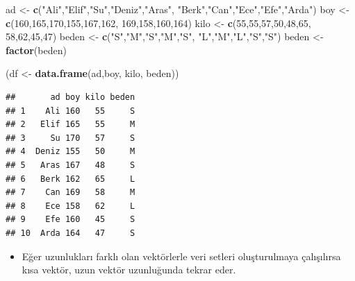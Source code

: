 \documentclass[
  oneside]{book}
\newenvironment{Shaded}{\begin{snugshade}}{\end{snugshade}}
\newcommand{\DecValTok}[1]{\textcolor[rgb]{0.00,0.00,0.81}{#1}}
\newcommand{\FunctionTok}[1]{\textcolor[rgb]{0.13,0.29,0.53}{\textbf{#1}}}
\newcommand{\NormalTok}[1]{#1}
\newcommand{\OtherTok}[1]{\textcolor[rgb]{0.56,0.35,0.01}{#1}}
\newcommand{\StringTok}[1]{\textcolor[rgb]{0.31,0.60,0.02}{#1}}
\providecommand{\tightlist}{%
  \setlength{\itemsep}{0pt}\setlength{\parskip}{0pt}}
\begin{document}
\begin{Shaded}
\begin{Highlighting}[]
\NormalTok{ad  }\OtherTok{\textless{}{-}}  \FunctionTok{c}\NormalTok{(}\StringTok{"Ali"}\NormalTok{,}\StringTok{"Elif"}\NormalTok{,}\StringTok{"Su"}\NormalTok{,}\StringTok{"Deniz"}\NormalTok{,}\StringTok{"Aras"}\NormalTok{, }\StringTok{"Berk"}\NormalTok{,}\StringTok{"Can"}\NormalTok{,}\StringTok{"Ece"}\NormalTok{,}\StringTok{"Efe"}\NormalTok{,}\StringTok{"Arda"}\NormalTok{)}
\NormalTok{boy }\OtherTok{\textless{}{-}} \FunctionTok{c}\NormalTok{(}\DecValTok{160}\NormalTok{,}\DecValTok{165}\NormalTok{,}\DecValTok{170}\NormalTok{,}\DecValTok{155}\NormalTok{,}\DecValTok{167}\NormalTok{,}\DecValTok{162}\NormalTok{, }\DecValTok{169}\NormalTok{,}\DecValTok{158}\NormalTok{,}\DecValTok{160}\NormalTok{,}\DecValTok{164}\NormalTok{)}
\NormalTok{kilo }\OtherTok{\textless{}{-}} \FunctionTok{c}\NormalTok{(}\DecValTok{55}\NormalTok{,}\DecValTok{55}\NormalTok{,}\DecValTok{57}\NormalTok{,}\DecValTok{50}\NormalTok{,}\DecValTok{48}\NormalTok{,}\DecValTok{65}\NormalTok{, }\DecValTok{58}\NormalTok{,}\DecValTok{62}\NormalTok{,}\DecValTok{45}\NormalTok{,}\DecValTok{47}\NormalTok{)}
\NormalTok{beden }\OtherTok{\textless{}{-}} \FunctionTok{c}\NormalTok{(}\StringTok{"S"}\NormalTok{,}\StringTok{"M"}\NormalTok{,}\StringTok{"S"}\NormalTok{,}\StringTok{"M"}\NormalTok{,}\StringTok{"S"}\NormalTok{, }\StringTok{"L"}\NormalTok{,}\StringTok{"M"}\NormalTok{,}\StringTok{"L"}\NormalTok{,}\StringTok{"S"}\NormalTok{,}\StringTok{"S"}\NormalTok{)}
\NormalTok{beden }\OtherTok{\textless{}{-}} \FunctionTok{factor}\NormalTok{(beden)}


\NormalTok{(df }\OtherTok{\textless{}{-}} \FunctionTok{data.frame}\NormalTok{(ad,boy, kilo, beden))}
\end{Highlighting}
\end{Shaded}

\begin{verbatim}
##       ad boy kilo beden
## 1    Ali 160   55     S
## 2   Elif 165   55     M
## 3     Su 170   57     S
## 4  Deniz 155   50     M
## 5   Aras 167   48     S
## 6   Berk 162   65     L
## 7    Can 169   58     M
## 8    Ece 158   62     L
## 9    Efe 160   45     S
## 10  Arda 164   47     S
\end{verbatim}

\begin{itemize}
\tightlist
\item
  Eğer uzunlukları farklı olan vektörlerle veri setleri oluşturulmaya çalışılırsa kısa vektör, uzun vektör uzunluğunda tekrar eder.
\end{itemize}
\end{document}
